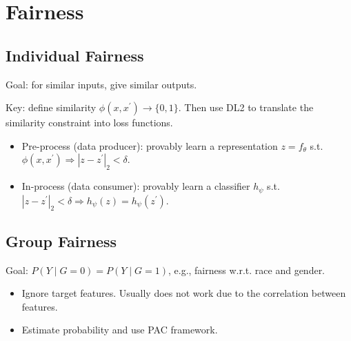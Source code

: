 \section{Fairness}

\subsection*{Individual Fairness}

Goal: for similar inputs, give similar outputs. 

Key: define similarity $\phi(x,x^\prime)\rightarrow \{0,1\}$. Then use DL2 to translate the similarity constraint into loss functions.

\begin{itemize}
    \item Pre-process (data producer): provably learn a representation $z=f_\theta$ s.t. $\phi(x,x^\prime)\Rightarrow |z-z^\prime|_2<\delta$.
    \item In-process (data consumer): provably learn a classifier $h_\psi$ s.t. $|z-z^\prime|_2<\delta \Rightarrow h_\psi(z) = h_\psi(z^\prime)$.
\end{itemize}

\subsection*{Group Fairness}

Goal: $P(Y\mid G=0)=P(Y\mid G=1)$, e.g., fairness w.r.t. race and gender.

\begin{itemize}
    \item Ignore target features. Usually does not work due to the correlation between features.
    \item Estimate probability and use PAC framework.
\end{itemize}